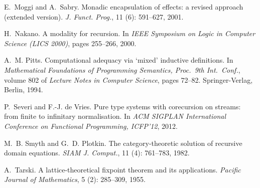 \documentclass[natbib]{sigplanconf}
\begin{document}
\begin{thebibliography}{24}
E.~Moggi and A.~Sabry.
\newblock Monadic encapsulation of effects: a revised approach (extended
  version).
\newblock \emph{J. Funct. Prog.}, 11 (6): 591--627, 2001.

H.~Nakano.
\newblock A modality for recursion.
\newblock In \emph{IEEE Symposium on Logic in Computer Science (LICS 2000)},
  pages 255--266, 2000.

A.~M. Pitts.
\newblock Computational adequacy via `mixed' inductive definitions.
\newblock In \emph{Mathematical Foundations of Programming Semantics, Proc.\
  9th Int.\ Conf.}, volume 802 of \emph{Lecture Notes in Computer Science},
  pages 72--82. Springer-Verlag, Berlin, 1994.

P.~Severi and F.-J. {de Vries}.
\newblock Pure type systems with corecursion on streams: from finite to
  infinitary normalisation.
\newblock In \emph{ACM SIGPLAN International Conference on Functional
  Programming, ICFP'12}, 2012.

M.~B. Smyth and G.~D. Plotkin.
\newblock The category-theoretic solution of recursive domain equations.
\newblock \emph{SIAM J. Comput.}, 11 (4):\penalty0 761--783, 1982.

A.~Tarski.
\newblock A lattice-theoretical fixpoint theorem and its applications.
\newblock \emph{Pacific Journal of Mathematics}, 5 (2):\penalty0
  285--309, 1955.

\end{thebibliography}


% 
% 

%
\end{document}
